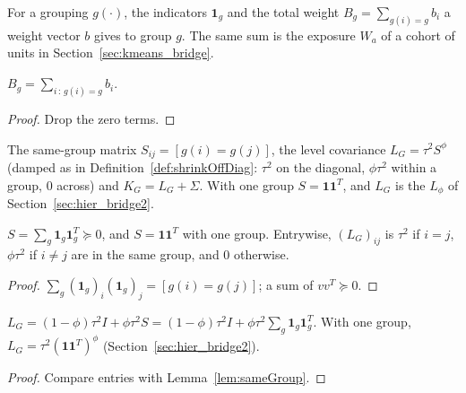 \begin{definition}\label{def:groupWeight}
  \leanok
  For a grouping $g(\cdot)$, the indicators $\mathbf 1_g$ and the total
  weight $B_g = \sum_{g(i) = g} b_i$ a weight vector $b$ gives to group $g$.
  The same sum is the exposure $W_a$ of a cohort of units in
  Section~\ref{sec:kmeans_bridge}.
\end{definition}

\begin{lemma}\label{lem:groupWeight_eq_filter}
  \leanok
  $B_g = \sum_{i \,:\, g(i) = g} b_i$.
\end{lemma}
\begin{proof}
  \leanok
  Drop the zero terms.
\end{proof}

\begin{definition}\label{def:KG}
  \leanok
  The same-group matrix $S_{ij} = [g(i) = g(j)]$, the level covariance
  $L_G = \tau^2 S^\phi$ (damped as in Definition~\ref{def:shrinkOffDiag}:
  $\tau^2$ on the diagonal, $\phi\tau^2$ within a group, $0$ across) and
  $K_G = L_G + \Sigma$. With one group $S = \mathbf 1\mathbf 1^T$, and $L_G$
  is the $L_\phi$ of Section~\ref{sec:hier_bridge2}.
\end{definition}

\begin{lemma}\label{lem:sameGroup}
  \leanok
  $S = \sum_g \mathbf 1_g\mathbf 1_g^T \succeq 0$, and $S = \mathbf 1\mathbf 1^T$
  with one group. Entrywise, $(L_G)_{ij}$ is $\tau^2$ if $i = j$, $\phi\tau^2$
  if $i \ne j$ are in the same group, and $0$ otherwise.
\end{lemma}
\begin{proof}
  \leanok
  $\sum_g (\mathbf 1_g)_i(\mathbf 1_g)_j = [g(i) = g(j)]$; a sum of
  $vv^T \succeq 0$.
\end{proof}

\begin{lemma}\label{lem:levelCovG_eq}
  \leanok
  $L_G = (1-\phi)\tau^2 I + \phi\tau^2 S
  = (1-\phi)\tau^2 I + \phi\tau^2\sum_g\mathbf 1_g\mathbf 1_g^T$. With one group,
  $L_G = \tau^2(\mathbf 1\mathbf 1^T)^\phi$ (Section~\ref{sec:hier_bridge2}).
\end{lemma}
\begin{proof}
  \leanok
  Compare entries with Lemma~\ref{lem:sameGroup}.
\end{proof}


